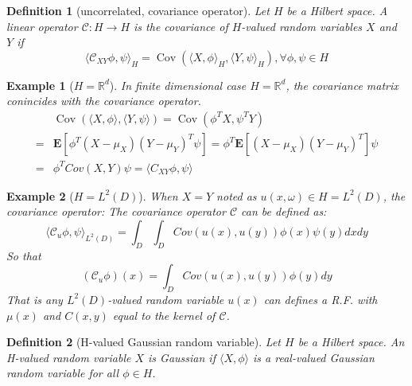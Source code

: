 \documentclass{article}
\newtheorem{definition}{Definition}
\newtheorem{example}{Example}
\begin{document}
\begin{definition}[uncorrelated, covariance operator]
  Let $H$ be a Hilbert space. A linear operator $\mathcal{C}:H\rightarrow H$ is the covariance of $H$-valued random variables $X$ and $Y$ if 
  \begin{equation}
      \langle\mathcal{C}_{XY}\phi, \psi\rangle_H = \operatorname{Cov}\left(\langle X, \phi\rangle_H, \langle Y, \psi\rangle_H\right), \forall \phi, \psi \in H
  \end{equation}
\end{definition}

\begin{example}[$H = \mathbb{R}^d$]
  In finite dimensional case $H = \mathbb{R}^d$, the covariance matrix conincides with the covariance operator. 
  \begin{equation}
      \begin{aligned}
          &\operatorname{Cov}\left(\langle X, \phi\rangle, \langle Y, \psi\rangle\right) 
          = \operatorname{Cov}\left(\phi^T X, \psi^T Y\right)\\
          =&\mathbf{E}\left[\phi^T(X-\mu_X)(Y-\mu_Y)^T\psi\right] 
          = \phi^T\mathbf{E}\left[(X-\mu_X)(Y-\mu_Y)^T\right]\psi\\
          =&\phi^T Cov(X, Y)\psi = \langle C_{XY}\phi, \psi\rangle
      \end{aligned}
  \end{equation}
\end{example}

\begin{example}[$H = L^2(D)$]
  When $X = Y$ noted as $u(x, \omega)\in H=L^2(D)$, the covariance operator:
  The covariance operator $\mathcal{C}$ can be defined as:
  \begin{equation}
  \langle\mathcal{C}_u\phi, \psi\rangle_{L^2(D)} = \int_D\int_D Cov(u(x), u(y)) \phi(x) \psi(y) dx dy
  \end{equation}
  So that 
  \begin{equation}
  (\mathcal{C}_u\phi)(x) = \int_D Cov(u(x), u(y)) \phi(y) dy
  \end{equation}
  That is any $L^2(D)$-valued random variable $u(x)$ can defines a R.F. with $\mu(x)$ and $C(x, y)$ equal to the kernel of $\mathcal{C}$.
\end{example}

\begin{definition}[H-valued Gaussian random variable]
  Let $H$ be a Hilbert space. An H-valued random variable $X$ is Gaussian if 
  $\langle X, \phi\rangle$ is a real-valued Gaussian random variable for all $\phi \in H$.
\end{definition}
\end{document}
